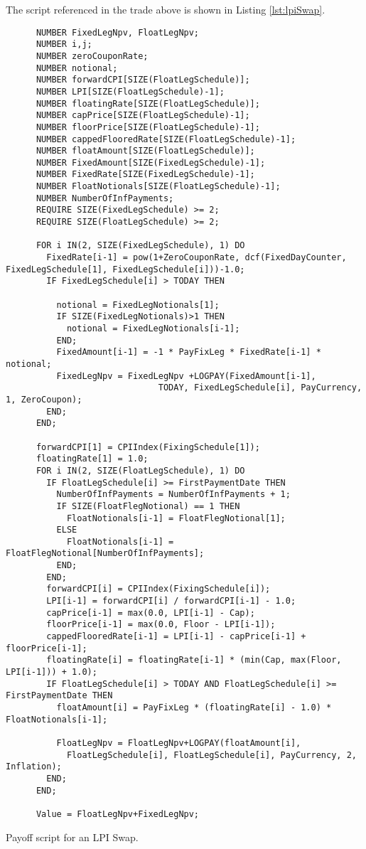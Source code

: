 The script referenced in the trade above is shown in Listing \ref{lst:lpiSwap}.

\begin{listing}[hbt]
  \begin{verbatim} 
      NUMBER FixedLegNpv, FloatLegNpv;
      NUMBER i,j;
      NUMBER zeroCouponRate;
      NUMBER notional;
      NUMBER forwardCPI[SIZE(FloatLegSchedule)];
      NUMBER LPI[SIZE(FloatLegSchedule)-1];
      NUMBER floatingRate[SIZE(FloatLegSchedule)];
      NUMBER capPrice[SIZE(FloatLegSchedule)-1];
      NUMBER floorPrice[SIZE(FloatLegSchedule)-1];
      NUMBER cappedFlooredRate[SIZE(FloatLegSchedule)-1];
      NUMBER floatAmount[SIZE(FloatLegSchedule)];
      NUMBER FixedAmount[SIZE(FixedLegSchedule)-1];
      NUMBER FixedRate[SIZE(FixedLegSchedule)-1];
      NUMBER FloatNotionals[SIZE(FloatLegSchedule)-1];
      NUMBER NumberOfInfPayments;
      REQUIRE SIZE(FixedLegSchedule) >= 2;
      REQUIRE SIZE(FloatLegSchedule) >= 2;
      
      FOR i IN(2, SIZE(FixedLegSchedule), 1) DO
        FixedRate[i-1] = pow(1+ZeroCouponRate, dcf(FixedDayCounter, FixedLegSchedule[1], FixedLegSchedule[i]))-1.0;
        IF FixedLegSchedule[i] > TODAY THEN
          
          notional = FixedLegNotionals[1];
          IF SIZE(FixedLegNotionals)>1 THEN
            notional = FixedLegNotionals[i-1];
          END;
          FixedAmount[i-1] = -1 * PayFixLeg * FixedRate[i-1] * notional;
          FixedLegNpv = FixedLegNpv +LOGPAY(FixedAmount[i-1],
                              TODAY, FixedLegSchedule[i], PayCurrency, 1, ZeroCoupon);
        END;
      END;
      
      forwardCPI[1] = CPIIndex(FixingSchedule[1]);
      floatingRate[1] = 1.0;
      FOR i IN(2, SIZE(FloatLegSchedule), 1) DO
        IF FloatLegSchedule[i] >= FirstPaymentDate THEN
          NumberOfInfPayments = NumberOfInfPayments + 1;
          IF SIZE(FloatFlegNotional) == 1 THEN
            FloatNotionals[i-1] = FloatFlegNotional[1];
          ELSE
            FloatNotionals[i-1] = FloatFlegNotional[NumberOfInfPayments];
          END;
        END;
        forwardCPI[i] = CPIIndex(FixingSchedule[i]);
        LPI[i-1] = forwardCPI[i] / forwardCPI[i-1] - 1.0;
        capPrice[i-1] = max(0.0, LPI[i-1] - Cap);
        floorPrice[i-1] = max(0.0, Floor - LPI[i-1]);
        cappedFlooredRate[i-1] = LPI[i-1] - capPrice[i-1] + floorPrice[i-1];
        floatingRate[i] = floatingRate[i-1] * (min(Cap, max(Floor, LPI[i-1])) + 1.0);
        IF FloatLegSchedule[i] > TODAY AND FloatLegSchedule[i] >= FirstPaymentDate THEN
          floatAmount[i] = PayFixLeg * (floatingRate[i] - 1.0) * FloatNotionals[i-1];
          
          FloatLegNpv = FloatLegNpv+LOGPAY(floatAmount[i],
            FloatLegSchedule[i], FloatLegSchedule[i], PayCurrency, 2, Inflation);
        END;
      END;
      
      Value = FloatLegNpv+FixedLegNpv;
\end{verbatim}
  \caption{Payoff script for an LPI Swap.}
  \label{lst:lpiSwap}
\end{listing}

